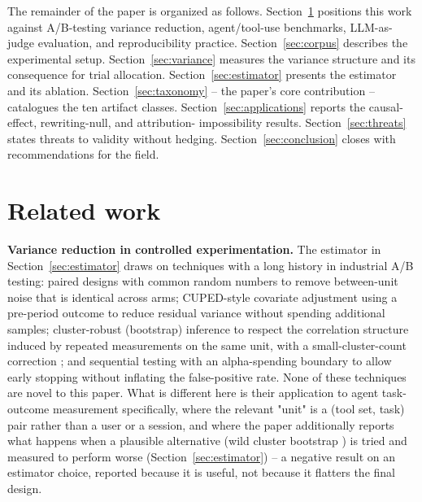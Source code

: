 \documentclass[11pt]{article}
\begin{document}
The remainder of the paper is organized as follows. Section~\ref{sec:related-work} positions this
work against A/B-testing variance reduction, agent/tool-use benchmarks, LLM-as-judge evaluation,
and reproducibility practice. Section~\ref{sec:corpus} describes the experimental setup.
Section~\ref{sec:variance} measures the variance structure and its consequence for trial
allocation. Section~\ref{sec:estimator} presents the estimator and its ablation.
Section~\ref{sec:taxonomy} -- the paper's core contribution -- catalogues the ten artifact classes.
Section~\ref{sec:applications} reports the causal-effect, rewriting-null, and attribution-
impossibility results. Section~\ref{sec:threats} states threats to validity without hedging.
Section~\ref{sec:conclusion} closes with recommendations for the field.

\section{Related work}
\label{sec:related-work}


\textbf{Variance reduction in controlled experimentation.} The estimator in
Section~\ref{sec:estimator} draws on techniques with a long history in industrial A/B
testing: paired designs with common random numbers \citep{law2014simulation} to remove
between-unit noise that is identical
across arms; CUPED-style covariate adjustment \citep{deng2013cuped} using a pre-period outcome to
reduce residual
variance without spending additional samples; cluster-robust (bootstrap) inference
\citep{cameron2015practitioner} to respect the
correlation structure induced by repeated measurements on the same unit, with a small-cluster-count
correction \citep{cameron2008bootstrap}; and sequential testing with an alpha-spending boundary
\citep{obrien1979multiple,lan1983discrete} to allow early stopping without
inflating the false-positive rate. None of these techniques are novel to this paper. What is
different here is their application to agent task-outcome measurement specifically, where the
relevant "unit" is a (tool set, task) pair rather than a user or a session, and where the paper
additionally reports what happens when a plausible alternative (wild cluster bootstrap
\citep{cameron2008bootstrap}) is tried
and measured to perform worse (Section~\ref{sec:estimator}) -- a negative result on an estimator
choice, reported because it is useful, not because it flatters the final design.
\end{document}
